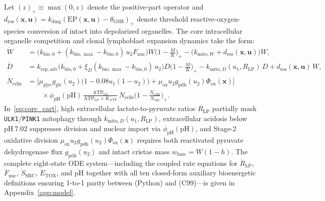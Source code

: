 \documentclass[11pt]{article}
\theoremstyle{plain}
\theoremstyle{remark}
\begin{document}
Let $(z)_+ \equiv \max(0, z)$ denote the positive-part operator and $d_{\mathrm{ros}}(\mathbf{x}, \mathbf{u}) = k_{\mathrm{dmg}}(\mathrm{EP}(\mathbf{x}, \mathbf{u}) - \theta_{\mathrm{GSH}})_+$ denote threshold reactive-oxygen-species conversion of intact into depolarized organelles. The core intracellular organelle competition and clonal lymphoblast expansion dynamics take the form:
\begin{subequations}
\label{eq:core_cart}
\begin{align}
  \dot{W} &= \big(k_{\mathrm{bio},0} + (k_{\mathrm{bio},\max} - k_{\mathrm{bio},0})\,u_2 F_{\mathrm{nuc}}\big)W\Big(1 - \frac{M}{K}\Big)_+ - \big(k_{\mathrm{mito},W} + d_{\mathrm{ros}}(\mathbf{x}, \mathbf{u})\big)W, \label{eq:ode_W} \\
  \dot{D} &= k_{\mathrm{rep,adv}}\big(k_{\mathrm{bio},0} + \xi_D(k_{\mathrm{bio},\max} - k_{\mathrm{bio},0})\,u_2\big)D\Big(1 - \frac{M}{K}\Big)_+ - k_{\mathrm{mito},D}(u_1, R_{\mathrm{LP}})\,D + d_{\mathrm{ros}}(\mathbf{x}, \mathbf{u})\,W, \label{eq:ode_D} \\
  \dot{N}_{\mathrm{cells}} &= \Big[\mu_{\mathrm{glyc}} g_{\mathrm{glc}}(u_2)\big(1 - 0.08 u_1(1 - u_2)\big) + \mu_{\mathrm{ox}} u_2 g_{\mathrm{pdh}}(u_2)\Phi_{\mathrm{ox}}(\mathbf{x})\Big] \nonumber\\
  &\qquad \times \phi_{\mathrm{pH}}(\mathrm{pH})\,\frac{\mathrm{ATP}_{\mathrm{tot}}}{\mathrm{ATP}_{\mathrm{tot}} + K_{\mathrm{ATP}}}\,N_{\mathrm{cells}}\Big(1 - \frac{N_{\mathrm{cells}}}{N_{\mathrm{cap}}}\Big)_+. \label{eq:ode_N}
\end{align}
\end{subequations}
In~\eqref{eq:core_cart}, high extracellular lactate-to-pyruvate ratios $R_{\mathrm{LP}}$ partially mask \texttt{ULK1}/\texttt{PINK1} mitophagy through $k_{\mathrm{mito},D}(u_1, R_{\mathrm{LP}})$, extracellular acidosis below $\mathrm{pH}\ 7.02$ suppresses division and nuclear import via $\phi_{\mathrm{pH}}(\mathrm{pH})$, and Stage-2 oxidative division $\mu_{\mathrm{ox}} u_2 g_{\mathrm{pdh}}(u_2)\Phi_{\mathrm{ox}}(\mathbf{x})$ requires both reactivated pyruvate dehydrogenase flux $g_{\mathrm{pdh}}(u_2)$ and intact cristae mass $w_{\mathrm{func}} = W(1 - h)$. The complete eight-state ODE system---including the coupled rate equations for $\dot{R}_{\mathrm{LP}}$, $\dot{F}_{\mathrm{nuc}}$, $\dot{S}_{\mathrm{SRC}}$, $\dot{E}_{\mathrm{TOX}}$, and $\dot{\mathrm{pH}}$ together with all ten closed-form auxiliary bioenergetic definitions ensuring 1-to-1 parity between  (Python) and  (C99)---is given in Appendix~\ref{app:model}.
\end{document}
